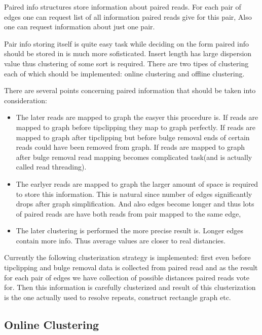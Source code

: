 \documentclass[14pt]{article}
\begin{document}
Paired info structures store information about paired reads. For each pair of edges one can request list of all information paired reads give for this pair, Also one can request information about just one pair.

Pair info storing itself is quite easy task while deciding on the form paired info should be stored in is much more sofisticated. Insert length has large dispersion value thus clustering of some sort is required. There are two tipes of clustering each of which should be implemented: online clustering and offline clustering.

There are several points concerning paired information that should be taken into consideration:

\begin{itemize}
\item The later reads are mapped to graph the easyer this procedure is. If reads are mapped to graph before tipclipping they map to graph perfectly. If reads are mapped to graph after tipclipping but before bulge removal ends of certain reads could have been removed from graph. If reads are mapped to graph after bulge removal read mapping becomes complicated task(and is actually called read threading).

\item The earlyer reads are mapped to graph the larger amount of space is required to store this information. This is natural since number of edges significantly drops after graph simplification. And also edges become longer and thus lots of paired reads are have both reads from pair mapped to the same edge,

\item The later clustering is performed the more precise result is. Longer edges contain more info. Thus average values are closer to real distancies.
\end{itemize}

Currently the following clusterization strategy is implemented: first even before tipclipping and bulge removal data is collected from paired read and as the result for each pair of edges we have collection of possible distances paired reads vote for. Then this information is carefully clusterized and result of this clusterization is the one actually used to resolve repeats, construct rectangle graph etc.

\subsection{Online Clustering}
\end{document}
